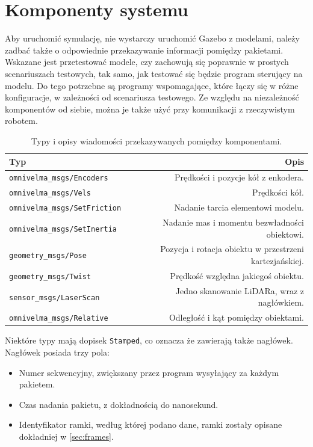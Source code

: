 \chapter{Komponenty systemu}
\label{sec:components}
Aby uruchomić symulację, nie wystarczy uruchomić Gazebo z modelami, należy zadbać także o odpowiednie przekazywanie informacji pomiędzy pakietami.
Wskazane jest przetestować modele, czy zachowują się poprawnie w prostych scenariuszach testowych, tak samo, jak testować się będzie program sterujący na modelu.
Do tego potrzebne są programy wspomagające, które łączy się w różne konfiguracje, w zależności od scenariusza testowego.
Ze względu na niezależność komponentów od siebie, można je także użyć przy komunikacji z rzeczywistym robotem.

\begin{table}
	\centering
	\begin{tabular}{l r}
		Typ & Opis \\
		\hline
		\texttt{omnivelma\_msgs/Encoders} & Prędkości i pozycje kół z enkodera. \\
		\texttt{omnivelma\_msgs/Vels} & Prędkości kół. \\
		\texttt{omnivelma\_msgs/SetFriction} & Nadanie tarcia elementowi modelu. \\
		\texttt{omnivelma\_msgs/SetInertia} & Nadanie mas i momentu bezwładności obiektowi. \\
		\texttt{geometry\_msgs/Pose} & Pozycja i rotacja obiektu w przestrzeni kartezjańskiej. \\
		\texttt{geometry\_msgs/Twist} & Prędkość względna jakiegoś obiektu. \\
		\texttt{sensor\_msgs/LaserScan} & Jedno skanowanie LiDARa, wraz z nagłówkiem. \\
		\texttt{omnivelma\_msgs/Relative} & Odległość i kąt pomiędzy obiektami. \\
	\end{tabular}
	\caption{Typy i opisy wiadomości przekazywanych pomiędzy komponentami.}
	\label{tab:messages}
\end{table}

Niektóre typy mają dopisek \texttt{Stamped}, co oznacza że zawierają także nagłówek.
Nagłówek posiada trzy pola:
\begin{itemize}
	\item Numer sekwencyjny, zwiększany przez program wysyłający za każdym pakietem.
	\item Czas nadania pakietu, z dokładnością do nanosekund.
	\item Identyfikator ramki, według której podano dane, ramki zostały opisane dokładniej w \ref{sec:frames}.
\end{itemize}

